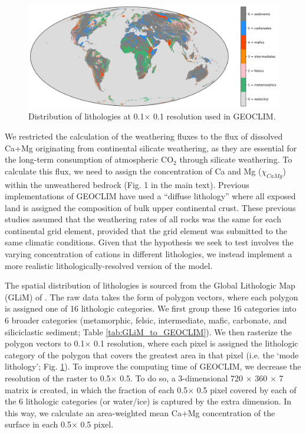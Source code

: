 \documentclass[11pt,letterpaper]{article}
\newcommand{\degrees}{\textdegree\xspace}
\newcommand{\COtwo}{CO$_{2}$\xspace}
\begin{document}
\begin{figure}[h!]
    \centering
    \includegraphics[width=1\textwidth]{Figures/world_lithology.jpg}
    \caption{Distribution of lithologies at 0.1\degrees $\times$ 0.1\degrees resolution used in GEOCLIM.}
    \label{fig:world_lithology}
\end{figure}

We restricted the calculation of the weathering fluxes to the flux of dissolved Ca+Mg originating from continental silicate weathering, as they are essential for the long-term consumption of atmospheric \COtwo through silicate weathering. To calculate this flux, we need to assign the concentration of Ca and Mg ($\chi_{CaMg}$) within the unweathered bedrock (Fig. 1 in the main text). Previous implementations of GEOCLIM have used a ``diffuse lithology'' where all exposed land is assigned the composition of bulk upper continental crust. These previous studies assumed that the weathering rates of all rocks was the same for each continental grid element, provided that the grid element was submitted to the same climatic conditions. Given that the hypothesis we seek to test involves the varying concentration of cations in different lithologies, we instead implement a more realistic lithologically-resolved version of the model.

The spatial distribution of lithologies is sourced from the Global Lithologic Map (GLiM) of \citet{Hartmann2012a}. The raw data takes the form of polygon vectors, where each polygon is assigned one of 16 lithologic categories. We first group these 16 categories into 6 broader categories (metamorphic, felsic, intermediate, mafic, carbonate, and siliciclastic sediment; Table \ref{tab:GLiM_to_GEOCLIM}). We then rasterize the polygon vectors to 0.1\degrees $\times$ 0.1\degrees resolution, where each pixel is assigned the lithologic category of the polygon that covers the greatest area in that pixel (i.e. the `mode lithology'; Fig. \ref{fig:world_lithology}). To improve the computing time of GEOCLIM, we decrease the resolution of the raster to 0.5\degrees $\times$ 0.5\degrees. To do so, a 3-dimensional 720 $\times$ 360 $\times$ 7 matrix is created, in which the fraction of each 0.5\degrees $\times$ 0.5\degrees pixel covered by each of the 6 lithologic categories (or water/ice) is captured by the extra dimension. In this way, we calculate an area-weighted mean Ca+Mg concentration of the surface in each 0.5\degrees $\times$ 0.5\degrees pixel.
\end{document}
